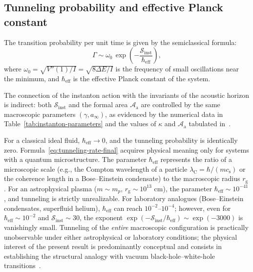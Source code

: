 \documentclass[12pt,a4paper,preprint]{elsarticle}
\begin{document}
        \subsection{Tunneling probability and effective Planck constant}\label{subsec:tunneling-probability}
            The transition probability per unit time is given by the semiclassical formula:
            \begin{equation}
                \Gamma \sim \omega_{0}\,\exp\left(-\frac{\mathcal{S}_{\mathrm{inst}}}{\hbar_{\mathrm{eff}}}\right),
                \label{eq:tunneling-rate-final}
            \end{equation}
            where $\omega_{0} = \sqrt{V''(1)/I} = \sqrt{8\Delta E/I}$ is the frequency of small oscillations near the minimum, and $\hbar_{\mathrm{eff}}$ is the effective Planck constant of the system.

            The connection of the instanton action with the invariants of the acoustic horizon is indirect: both $\mathcal{S}_{\mathrm{inst}}$ and the formal area $\mathcal{A}_{\mathrm{a}}$ are controlled by the same macroscopic parameters $(\gamma, a_{\infty})$, as evidenced by the numerical data in Table~\ref{tab:instanton-parameters} and the values of $\kappa$ and $\mathcal{A}_{\mathrm{a}}$ tabulated in~\cite{SemyannikovAV_AcousticGeometryAndSoundRayDynamicsInRelativisticSphericalAccretion_2026}.
            
            For a classical ideal fluid, $\hbar_{\mathrm{eff}} \to 0$, and the tunneling probability is identically zero. Formula~\eqref{eq:tunneling-rate-final} acquires physical meaning only for systems with a quantum microstructure. The parameter $\hbar_{\mathrm{eff}}$ represents the ratio of a microscopic scale (e.g., the Compton wavelength of a particle $\lambda_{\mathrm{C}} = \hbar/(m c_{\mathrm{s}})$ or the coherence length in a Bose--Einstein condensate) to the macroscopic radius $r_{\mathrm{g}}$. For an astrophysical plasma ($m \sim m_{p}$, $r_{\mathrm{g}} \sim 10^{13}$ cm), the parameter $\hbar_{\mathrm{eff}} \sim 10^{-41}$, and tunneling is strictly unrealizable. For laboratory analogues (Bose--Einstein condensates, superfluid helium), $\hbar_{\mathrm{eff}}$ can reach $10^{-2}$--$10^{-4}$; however, even for $\hbar_{\mathrm{eff}} \sim 10^{-2}$ and $\mathcal{S}_{\mathrm{inst}} \sim 30$, the exponent $\exp(-\mathcal{S}_{\mathrm{inst}}/\hbar_{\mathrm{eff}}) \sim \exp(-3000)$ is vanishingly small. Tunneling of the \emph{entire} macroscopic configuration is practically unobservable under either astrophysical or laboratory conditions; the physical interest of the present result is predominantly conceptual and consists in establishing the structural analogy with vacuum black-hole--white-hole transitions~\cite{VolovikGE_PainleveGullstrandCoordinatesForSchwarzschildDeSitterSpacetime_2023}.
\end{document}
